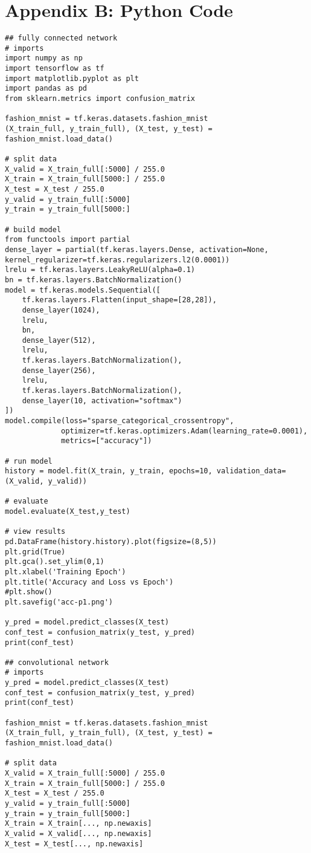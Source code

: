 \documentclass[a4paper,10 pt]{article}
\begin{document}
\section{Appendix B: Python Code}
\begin{lstlisting}
## fully connected network
# imports
import numpy as np
import tensorflow as tf
import matplotlib.pyplot as plt
import pandas as pd
from sklearn.metrics import confusion_matrix

fashion_mnist = tf.keras.datasets.fashion_mnist
(X_train_full, y_train_full), (X_test, y_test) = fashion_mnist.load_data()

# split data
X_valid = X_train_full[:5000] / 255.0
X_train = X_train_full[5000:] / 255.0
X_test = X_test / 255.0
y_valid = y_train_full[:5000]
y_train = y_train_full[5000:]

# build model
from functools import partial
dense_layer = partial(tf.keras.layers.Dense, activation=None, kernel_regularizer=tf.keras.regularizers.l2(0.0001))
lrelu = tf.keras.layers.LeakyReLU(alpha=0.1)
bn = tf.keras.layers.BatchNormalization()
model = tf.keras.models.Sequential([
    tf.keras.layers.Flatten(input_shape=[28,28]),
    dense_layer(1024),
    lrelu,
    bn,
    dense_layer(512),
    lrelu,
    tf.keras.layers.BatchNormalization(),
    dense_layer(256),
    lrelu,
    tf.keras.layers.BatchNormalization(),
    dense_layer(10, activation="softmax")
])
model.compile(loss="sparse_categorical_crossentropy",
             optimizer=tf.keras.optimizers.Adam(learning_rate=0.0001),
             metrics=["accuracy"])
             
# run model
history = model.fit(X_train, y_train, epochs=10, validation_data=(X_valid, y_valid))

# evaluate
model.evaluate(X_test,y_test)

# view results
pd.DataFrame(history.history).plot(figsize=(8,5))
plt.grid(True)
plt.gca().set_ylim(0,1)
plt.xlabel('Training Epoch')
plt.title('Accuracy and Loss vs Epoch')
#plt.show()
plt.savefig('acc-p1.png')

y_pred = model.predict_classes(X_test)
conf_test = confusion_matrix(y_test, y_pred)
print(conf_test)

## convolutional network
# imports
y_pred = model.predict_classes(X_test)
conf_test = confusion_matrix(y_test, y_pred)
print(conf_test)

fashion_mnist = tf.keras.datasets.fashion_mnist
(X_train_full, y_train_full), (X_test, y_test) = fashion_mnist.load_data()

# split data
X_valid = X_train_full[:5000] / 255.0
X_train = X_train_full[5000:] / 255.0
X_test = X_test / 255.0
y_valid = y_train_full[:5000]
y_train = y_train_full[5000:]
X_train = X_train[..., np.newaxis]
X_valid = X_valid[..., np.newaxis]
X_test = X_test[..., np.newaxis]


\end{lstlisting}
\end{document}
